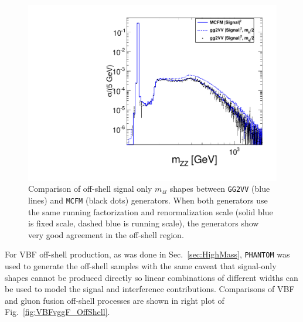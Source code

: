 \begin{figure}[htbp]
\begin{center}
\includegraphics[width=.5\linewidth]{HiggsProperties/figures/gg2VVvsMCFM.pdf}
\caption[Comparison of Off-shell Differential Cross Section between gg2VV and MCFM]{Comparison of off-shell signal only $m_{4l}$ shapes between {\tt GG2VV} (blue lines) and {\tt MCFM} (black dots) generators. When both generators use the same running factorization and renormalization scale (solid blue is fixed scale, dashed blue is running scale), the generators show very good agreement in the off-shell region.}
\label{fig:gg2VVMCFMComparison}
\end{center}
\end{figure}

For VBF off-shell production, as was done in Sec.~\ref{sec:HighMass}, {\tt PHANTOM} was used to generate the off-shell samples with the same caveat that signal-only shapes cannot be produced directly so linear combinations of different widths can be used to model the signal and interference contributions. Comparisons of VBF and gluon fusion off-shell processes are shown in right plot of Fig.~\ref{fig:VBFvggF_OffShell}.

